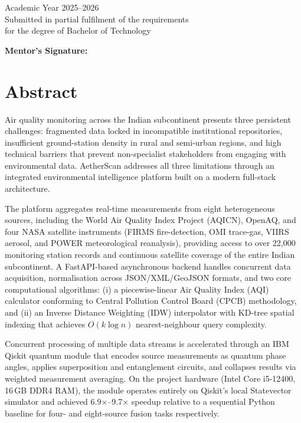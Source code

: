 \documentclass[12pt,a4paper]{article}
\begin{document}
\begin{titlepage}
{\large Academic Year 2025--2026}\\[0.3cm]
{\normalsize Submitted in partial fulfilment of the requirements\\
for the degree of Bachelor of Technology}

\vspace{1cm}
\begin{flushright}
\textbf{Mentor's Signature:}\quad\underline{\hspace{4cm}}
\end{flushright}
\end{titlepage}

\clearpage
\section*{Abstract}

Air quality monitoring across the Indian subcontinent presents three persistent
challenges: fragmented data locked in incompatible institutional repositories,
insufficient ground-station density in rural and semi-urban regions, and high
technical barriers that prevent non-specialist stakeholders from engaging with
environmental data. AetherScan addresses all three limitations through an
integrated environmental intelligence platform built on a modern full-stack
architecture.

The platform aggregates real-time measurements from eight heterogeneous sources,
including the World Air Quality Index Project (AQICN), OpenAQ, and four NASA
satellite instruments (FIRMS fire-detection, OMI trace-gas, VIIRS aerosol, and
POWER meteorological reanalysis), providing access to over 22,000 monitoring
station records and continuous satellite coverage of the entire Indian
subcontinent. A FastAPI-based asynchronous backend handles concurrent data
acquisition, normalisation across JSON/XML/GeoJSON formats, and two core
computational algorithms: (i) a piecewise-linear Air Quality Index (AQI)
calculator conforming to Central Pollution Control Board (CPCB) methodology,
and (ii) an Inverse Distance Weighting (IDW) interpolator with KD-tree spatial
indexing that achieves $O(k\log n)$ nearest-neighbour query complexity.

Concurrent processing of multiple data streams is accelerated through an IBM
Qiskit quantum module that encodes source measurements as quantum phase angles,
applies superposition and entanglement circuits, and collapses results via
weighted measurement averaging. On the project hardware (Intel Core i5-12400,
16\,GB DDR4 RAM), the module operates entirely on Qiskit's local Statevector
simulator and achieved 6.9$\times$--9.7$\times$ speedup relative to a sequential
Python baseline for four- and eight-source fusion tasks respectively.
\end{document}
